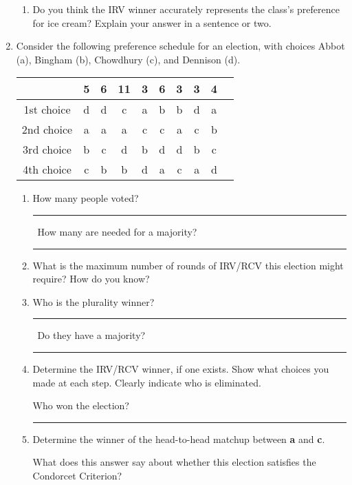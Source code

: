 \documentclass[12pt]{article}
\newcommand{\ans}[1][1in]{\rule{#1}{.5pt}}
\begin{document}
\begin{enumerate}
\begin{enumerate}
\item Do you think the IRV winner accurately represents the class's preference for ice cream? Explain your answer in a sentence or two. \vspace{1in}
\end{enumerate}

\newpage    

\item Consider the following preference schedule for an election, with choices Abbot (a), Bingham (b), Chowdhury (c), and Dennison (d).

\begin{tabular}{|c || c | c | c | c | c | c | c | c | c|}
\hline
			& 5 & 6 & 11 & 3 & 6 & 3 & 3 & 4  \\ \hline
1st choice  & d & d & c  & a & b & b & d & a\\
2nd choice  & a & a & a  & c & c & a & c & b \\
3rd choice  & b & c & d  & b & d & d & b & c\\
4th choice  & c & b & b  & d & a & c & a & d\\
\hline
\end{tabular}

\begin{enumerate}
\item How many people voted? \ans\ How many are needed for a majority? \ans
\item What is the maximum number of rounds of IRV/RCV this election might require? How do you know?
\vspace{1cm}
\item Who is the plurality winner? \ans\ Do they have a majority? \ans

\vspace{1cm}

\item Determine the IRV/RCV winner, if one exists. Show what choices you made at each step. Clearly indicate who is eliminated.

\vfill
Who won the election? \ans[3in]

\bigskip

\item Determine the winner of the head-to-head matchup between {\bf a} and {\bf c}. \hrulefill

What does this answer say about whether this election satisfies the Condorcet Criterion? 
\vspace{1in}

\end{enumerate}


\end{enumerate}
\end{document}
